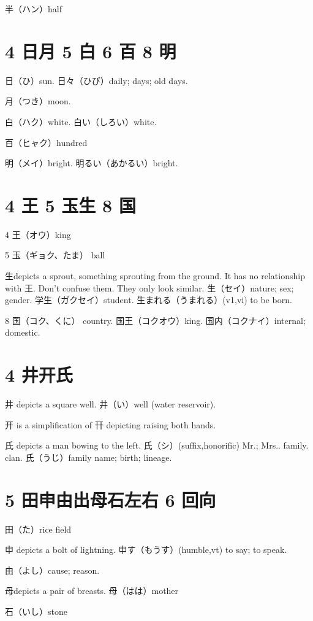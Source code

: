 半（ハン）half

\section{4 日月 5 白 6 百 8 明}

日（ひ）sun.
日々（ひび）daily; days; old days.

月（つき）moon.

白（ハク）white.
白い（しろい）white.

百（ヒャク）hundred

明（メイ）bright.
明るい（あかるい）bright.

\section{4 王 5 玉生 8 国}

4 王（オウ）king

5 玉（ギョク、たま） ball

生depicts a sprout, something sprouting from the ground.
It has no relationship with 王.
Don't confuse them.
They only look similar.
生（セイ）nature; sex; gender.
学生（ガクセイ）student.
生まれる（うまれる）(v1,vi) to be born.

8 国（コク、くに） country.
国王（コクオウ）king.
国内（コクナイ）internal; domestic.

\section{4 井开氏}

井 depicts a square well.
井（い）well (water reservoir).

开 is a simplification of 幵 depicting raising both hands.

氏 depicts a man bowing to the left.
氏（シ）(suffix,honorific) Mr.; Mrs.. family. clan.
氏（うじ）family name; birth; lineage.

\section{5 田申由出母石左右 6 回向}

田（た）rice field

申 depicts a bolt of lightning.
申す（もうす）(humble,vt) to say; to speak.

由（よし）cause; reason.

母depicts a pair of breasts.
母（はは）mother

石（いし）stone

